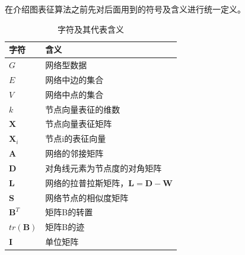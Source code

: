 在介绍图表征算法之前先对后面用到的符号及含义进行统一定义。
\begin{table}
	\centering
	\caption{字符及其代表含义}
	\begin{tabular}{|C{1.8in}|C{3.3in}|}
		\hline
		\textbf{字符} & \textbf{含义} \\ \hline\hline
		$G$ & 网络型数据 \\ \hline
		$E$ & 网络中边的集合 \\ \hline
		$V$& 网络中点的集合 \\ \hline
		$k$ & 节点向量表征的维数  \\ \hline
		$\textbf{X}$ & 节点向量表征矩阵 \\ \hline
		$\textbf{X}_i$ & 节点i的表征向量 \\ \hline
		$\textbf{A}$ & 网络的邻接矩阵 \\ \hline
		$\textbf{D}$ & 对角线元素为节点度的对角矩阵\\ \hline
		$\textbf{L}$ & 网络的拉普拉斯矩阵，$\textbf{L}=\textbf{D}-\textbf{W}$ \\ \hline
		$\textbf{S}$ & 网络节点的相似度矩阵 \\ \hline
		$\textbf{B}^T$ & 矩阵B的转置 \\ \hline
		$tr(\textbf{B})$ & 矩阵B的迹 \\ \hline
		$\textbf{I}$ & 单位矩阵 \\ \hline
	\end{tabular}
\end{table}

